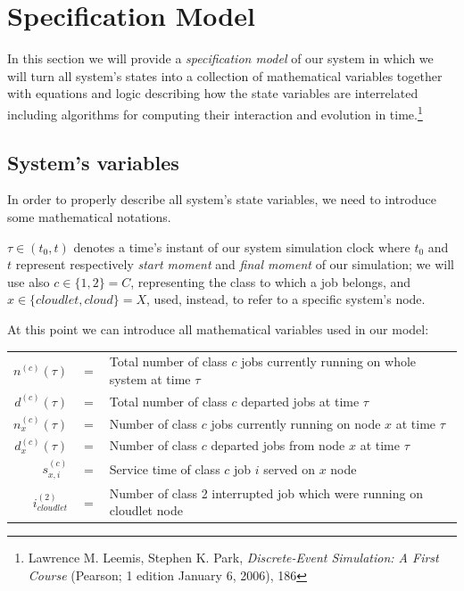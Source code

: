 \documentclass[10pt,a4paper]{article}
\begin{document}
\clearpage
\newpage
\section{Specification  Model}

In this section we will provide a \textit{specification model} of our system in which we will turn all system's states into a collection of mathematical variables together with equations and logic describing how the state variables are interrelated including algorithms for computing their interaction and evolution in time.\footnote{Lawrence M. Leemis, Stephen K. Park, \textit{Discrete-Event Simulation: A First Course} (Pearson; 1 edition January 6, 2006), 186}

\subsection{System's variables}

In order to properly describe all system's state variables, we need to introduce some mathematical notations.

$\tau \in (t_0, t)$ denotes a time's instant of our system simulation clock where $t_0$ and $t$ represent respectively \textit{start moment} and \textit{final moment} of our simulation; we will use also $c \in \lbrace 1,2 \rbrace = C$, representing the class to which a job belongs, and $x \in \lbrace cloudlet,cloud \rbrace = X$, used, instead, to refer to a specific system's node.

At this point we can introduce all mathematical variables used in our model:

\begin{table}[h!]
    \centering
    \small
    \begin{tabular}{rcl}
       
      $n^{(c)}(\tau)$ & $ = $ & Total number of class $c$ jobs currently running on whole system at time $\tau$ \\
      $d^{(c)}(\tau)$ & $ = $ & Total number of class $c$ departed jobs at time $\tau$ \\
      $n_x^{(c)}(\tau)$ & $ = $ & Number of class $c$ jobs currently running on node $x$ at time $\tau$ \\
      $d_x^{(c)}(\tau)$ & $ = $ & Number of class $c$ departed jobs from node $x$ at time $\tau$ \\
      $s_{x,i}^{(c)}$ & $ = $ & Service time of class $c$ job $i$ served on $x$ node   \\
      $i_{cloudlet}^{(2)}$ & $ = $ & Number of class 2 interrupted job which were running on cloudlet node\\
          
    \end{tabular}
\end{table}
\end{document}
